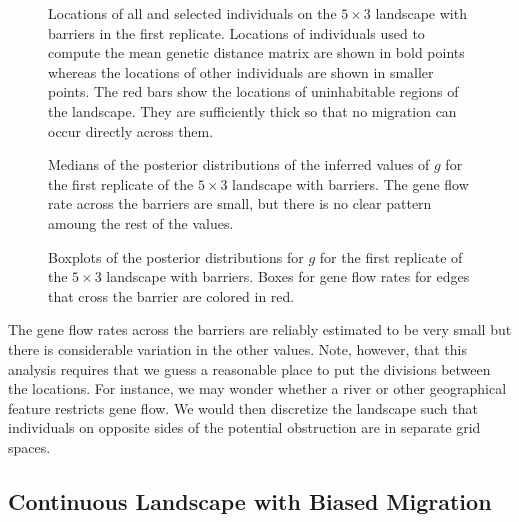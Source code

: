 \documentclass{article}
\begin{document}
\begin{figure}
\centering
\caption{Locations of all and selected individuals on the $5 \times 3$ landscape with barriers
in the first replicate.
Locations of individuals used to compute the mean genetic distance matrix are shown in bold points
whereas the locations of other individuals are shown in smaller points.
The red bars show the locations of uninhabitable regions of the landscape.
They are sufficiently thick so that no migration can occur directly across them.}
\label{fig:ind_locs_5x3b_1}
\end{figure}

\begin{figure}
\centering
\caption{Medians of the posterior distributions of the inferred values of $g$ 
for the first replicate of the $5 \times 3$ landscape with barriers.
The gene flow rate across the barriers are small, 
but there is no clear pattern amoung the rest of the values.}
\label{fig:grid_5x3b_1}
\end{figure}

\begin{figure}
\centering
\caption{Boxplots of the posterior distributions for $g$ 
for the first replicate of the $5 \times 3$ landscape with barriers.
Boxes for gene flow rates for edges that cross the barrier are colored in red.}
\label{fig:post_dists_5x3b_1}
\end{figure}

The gene flow rates across the barriers are reliably estimated to be very small
but there is considerable variation in the other values.
Note, however, that this analysis requires that we guess a reasonable place
to put the divisions between the locations.
For instance, we may wonder whether a river or other geographical feature
restricts gene flow.
We would then discretize the landscape such that individuals on opposite sides of the 
potential obstruction are in separate grid spaces.


\subsection*{Continuous Landscape with Biased Migration}
\end{document}
